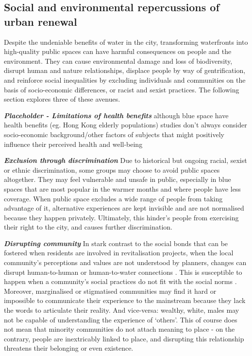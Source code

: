 \documentclass{article}
\newcommand{\bisection}[1]{\textbf{\textit{#1}}}
\begin{document}

\subsection{Social and environmental repercussions of urban renewal}

Despite the undeniable benefits of water in the city, transforming waterfronts into high-quality public spaces can have harmful consequences on people and the environment. They can cause environmental damage and loss of biodiversity, disrupt human and nature relationships, displace people by way of gentrification, and reinforce social inequalities by excluding individuals and communities on the basis of socio-economic differences, or racist and sexist practices. The following section explores three of these avenues.


\bisection{Placeholder - Limitations of health benefits} although blue space have health benefits (eg. Hong Kong elderly populations) studies don't always consider socio-economic background/other factors of subjects that might positively influence their perceived health and well-being

\bisection{Exclusion through discrimination} Due to historical but ongoing racial, sexist or ethnic discrimination, some groups may choose to avoid public spaces altogether. They may feel vulnerable and unsafe in public, especially in blue spaces that are most popular in the warmer months and where people have less coverage.
When public space excludes a wide range of people from taking advantage of it, alternative experiences are kept invisible and are not normalised because they happen privately. Ultimately, this hinder's people from exercising their right to the city, and causes further discrimination.

\bisection{Disrupting community} 
In stark contrast to the social bonds that can be fostered when residents are involved in revitalisation projects, when the local community's perceptions and values are not understood by planners, changes can disrupt human-to-human or human-to-water connections \parencite{toomey2021place}. This is susceptible to happen when a community's social practices do not fit with the social norms \parencite{wessells2014urban}. 
Moreover, marginalised or stigmatised communities may find it hard or impossible to communicate their experience to the mainstream because they lack the words to articulate their reality. And vice-versa: wealthy, white, males may not be capable of understanding the experience of `others'.
This of course does not mean that minority communities do not attach meaning to place - on the contrary, people are inextricably linked to place, and disrupting this relationship threatens their belonging or even existence.
\end{document}

